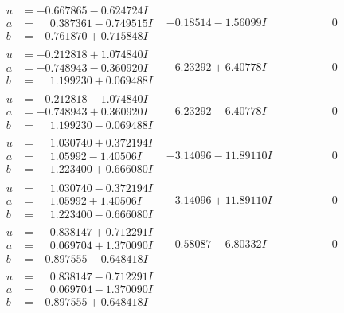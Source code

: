 \documentclass[1p]{elsarticle_modified}
\theoremstyle{definition}
\begin{document}
$$\begin{array}{c|c|c}
\begin{aligned}
u &= -0.667865 - 0.624724 I \\
a &= \phantom{-}0.387361 - 0.749515 I \\
b &= -0.761870 + 0.715848 I\end{aligned}
 & -0.18514 - 1.56099 I & \phantom{-0.000000 } 0 \\ \hline\begin{aligned}
u &= -0.212818 + 1.074840 I \\
a &= -0.748943 - 0.360920 I \\
b &= \phantom{-}1.199230 + 0.069488 I\end{aligned}
 & -6.23292 + 6.40778 I & \phantom{-0.000000 } 0 \\ \hline\begin{aligned}
u &= -0.212818 - 1.074840 I \\
a &= -0.748943 + 0.360920 I \\
b &= \phantom{-}1.199230 - 0.069488 I\end{aligned}
 & -6.23292 - 6.40778 I & \phantom{-0.000000 } 0 \\ \hline\begin{aligned}
u &= \phantom{-}1.030740 + 0.372194 I \\
a &= \phantom{-}1.05992 - 1.40506 I \\
b &= \phantom{-}1.223400 + 0.666080 I\end{aligned}
 & -3.14096 - 11.89110 I & \phantom{-0.000000 } 0 \\ \hline\begin{aligned}
u &= \phantom{-}1.030740 - 0.372194 I \\
a &= \phantom{-}1.05992 + 1.40506 I \\
b &= \phantom{-}1.223400 - 0.666080 I\end{aligned}
 & -3.14096 + 11.89110 I & \phantom{-0.000000 } 0 \\ \hline\begin{aligned}
u &= \phantom{-}0.838147 + 0.712291 I \\
a &= \phantom{-}0.069704 + 1.370090 I \\
b &= -0.897555 - 0.648418 I\end{aligned}
 & -0.58087 - 6.80332 I & \phantom{-0.000000 } 0 \\ \hline\begin{aligned}
u &= \phantom{-}0.838147 - 0.712291 I \\
a &= \phantom{-}0.069704 - 1.370090 I \\
b &= -0.897555 + 0.648418 I\end{aligned}

\end{array}$$
\end{document}
